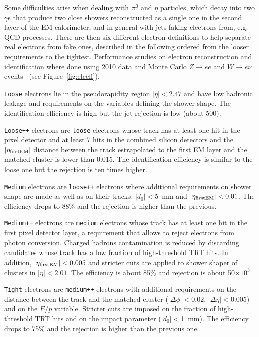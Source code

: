 Some difficulties arise when dealing with $\pi^0$ and $\eta$ particles, which decay into two $\gamma$s
that produce two close showers reconstructed as a single one in the second layer of the EM
calorimeter, and in general with jets faking electrons from, e.g. QCD processes.
There are then six different electron definitions to help separate real electrons from fake ones,
described in the following ordered from the looser requirements to the tightest.
Performance studies on electron reconstruction and identification where done using 2010 data and Monte
Carlo $Z\to ee$ and $W\to e\nu$ events~\cite{eperf} (see Figure~\ref{fig:eleeff}). 

\texttt{Loose} electrons lie in the pseudorapidity region $|\eta| < 2.47$ and have 
low hadronic leakage and requirements on the variables defining the shower shape.
The identification efficiency is high but the jet rejection is low (about 500).

\texttt{Loose++} electrons are \texttt{loose} electrons whose track has at least one hit in 
the pixel detector and at least 7 hits in the combined silicon detectors and the
$|\eta_{\rm first EM}|$ distance between the track estrapolated to the first EM layer and
the matched cluster is lower than 0.015. The identification
efficiency is similar to the loose one but the rejection is ten times higher.

\texttt{Medium} electrons are \texttt{loose++} electrons where additional requirements on shower shape
are made as well as on their tracks: $|d_0|<$5~mm and $|\eta_{\rm first EM}|<0.01$.
The efficiency drops to 88\% and the rejection is
higher than the previous.

\texttt{Medium++} electrons are \texttt{medium} electrons whose track has at least one hit in the
first pixel detector layer, a requirement that allows to reject electrons from
photon conversion. Charged hadrons contamination is reduced by discarding candidates
whose track has a low fraction of high-threshold TRT hits. In addition, $|\eta_{\rm first EM}|<0.005$ 
and stricter cuts are applied to shower shaper of clusters in $|\eta|<2.01$. The
efficiency is about 85\% and rejection is about 50$\times 10^3$.

\texttt{Tight} electrons are \texttt{medium++} electrons with additional requirements on the distance
between the track and the matched cluster ($|\Delta\phi|<0.02$, $|\Delta\eta|<0.005$) and on the $E/p$
variable. Stricter cuts are imposed on the fraction of high-threshold TRT hits and on the impact parameter
($|d_0|<$1~mm). The efficiency drops to 75\% and the rejection is higher than the previous one.

